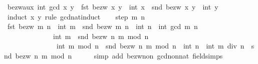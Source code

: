 \begin{isabellebody}
\isanewline
\isanewline
{}\isamarkupfalse%
\ bezw{\isacharunderscore}{\kern0pt}aux{\isacharcolon}{\kern0pt}\ {\isachardoublequoteopen}int\ {\isacharparenleft}{\kern0pt}gcd\ x\ y{\isacharparenright}{\kern0pt}\ {\isacharequal}{\kern0pt}\ fst\ {\isacharparenleft}{\kern0pt}bezw\ x\ y{\isacharparenright}{\kern0pt}\ {\isacharasterisk}{\kern0pt}\ int\ x\ {\isacharplus}{\kern0pt}\ snd\ {\isacharparenleft}{\kern0pt}bezw\ x\ y{\isacharparenright}{\kern0pt}\ {\isacharasterisk}{\kern0pt}\ int\ y{\isachardoublequoteclose}\isanewline
%
\isadelimproof
%
\endisadelimproof
%
\isatagproof
{}\isamarkupfalse%
\ {\isacharparenleft}{\kern0pt}induct\ x\ y\ rule{\isacharcolon}{\kern0pt}\ gcd{\isacharunderscore}{\kern0pt}nat{\isacharunderscore}{\kern0pt}induct{\isacharparenright}{\kern0pt}\isanewline
\ \ \isamarkupfalse%
\ {\isacharparenleft}{\kern0pt}step\ m\ n{\isacharparenright}{\kern0pt}\isanewline
\ \ \isamarkupfalse%
\ \isamarkupfalse%
\ {\isachardoublequoteopen}fst\ {\isacharparenleft}{\kern0pt}bezw\ m\ n{\isacharparenright}{\kern0pt}\ {\isacharasterisk}{\kern0pt}\ int\ m\ {\isacharplus}{\kern0pt}\ snd\ {\isacharparenleft}{\kern0pt}bezw\ m\ n{\isacharparenright}{\kern0pt}\ {\isacharasterisk}{\kern0pt}\ int\ n\ {\isacharminus}{\kern0pt}\ int\ {\isacharparenleft}{\kern0pt}gcd\ m\ n{\isacharparenright}{\kern0pt}\ \isanewline
\ \ \ \ \ \ \ \ \ \ \ \ \ {\isacharequal}{\kern0pt}\ int\ m\ {\isacharasterisk}{\kern0pt}\ snd\ {\isacharparenleft}{\kern0pt}bezw\ n\ {\isacharparenleft}{\kern0pt}m\ mod\ n{\isacharparenright}{\kern0pt}{\isacharparenright}{\kern0pt}\ {\isacharminus}{\kern0pt}\isanewline
\ \ \ \ \ \ \ \ \ \ \ \ \ \ \ {\isacharparenleft}{\kern0pt}int\ {\isacharparenleft}{\kern0pt}m\ mod\ n{\isacharparenright}{\kern0pt}\ {\isacharasterisk}{\kern0pt}\ snd\ {\isacharparenleft}{\kern0pt}bezw\ n\ {\isacharparenleft}{\kern0pt}m\ mod\ n{\isacharparenright}{\kern0pt}{\isacharparenright}{\kern0pt}\ {\isacharplus}{\kern0pt}\ int\ n\ {\isacharasterisk}{\kern0pt}\ {\isacharparenleft}{\kern0pt}int\ {\isacharparenleft}{\kern0pt}m\ div\ n{\isacharparenright}{\kern0pt}\ {\isacharasterisk}{\kern0pt}\ snd\ {\isacharparenleft}{\kern0pt}bezw\ n\ {\isacharparenleft}{\kern0pt}m\ mod\ n{\isacharparenright}{\kern0pt}{\isacharparenright}{\kern0pt}{\isacharparenright}{\kern0pt}{\isacharparenright}{\kern0pt}{\isachardoublequoteclose}\isanewline
\ \ \ \ \isamarkupfalse%
\ {\isacharparenleft}{\kern0pt}simp\ add{\isacharcolon}{\kern0pt}\ bezw{\isacharunderscore}{\kern0pt}non{\isacharunderscore}{\kern0pt}{}\ gcd{\isacharunderscore}{\kern0pt}non{\isacharunderscore}{\kern0pt}{}{\isacharunderscore}{\kern0pt}nat\ field{\isacharunderscore}{\kern0pt}simps{\isacharparenright}{\kern0pt}\isanewline

\end{isabellebody}
